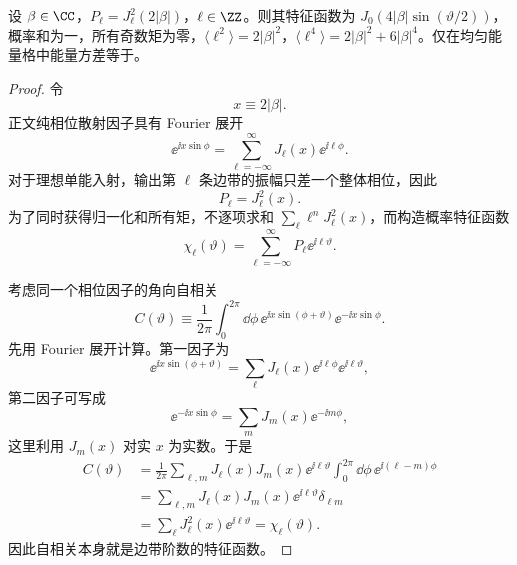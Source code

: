 \begin{lemma}
设 $\beta\in\CC$，$P_\ell=J_\ell^2(2|\beta|)$，$\ell\in\ZZ$。则其特征函数为 $J_0(4|\beta|\sin(\vartheta/2))$，概率和为一，所有奇数矩为零，$\langle\ell^2\rangle=2|\beta|^2$，$\langle\ell^4\rangle=2|\beta|^2+6|\beta|^4$。仅在均匀能量格中能量方差等于。
\end{lemma}
\begin{proof}
令
\begin{equation*}
 x\equiv2|\beta|.
\end{equation*}
正文纯相位散射因子具有 Fourier 展开
\begin{equation*}
 \ee^{\ii x\sin\phi}
 =\sum_{\ell=-\infty}^{\infty}
 J_\ell(x)\ee^{\ii\ell\phi}.
\end{equation*}
对于理想单能入射，输出第 $\ell$ 条边带的振幅只差一个整体相位，因此
\begin{equation*}
 P_\ell=J_\ell^2(x).
\end{equation*}
为了同时获得归一化和所有矩，不逐项求和 $\sum_\ell \ell^nJ_\ell^2(x)$，而构造概率特征函数
\begin{equation*}
 \chi_\ell(\vartheta)
 =\sum_{\ell=-\infty}^{\infty}
 P_\ell \ee^{\ii\ell\vartheta}.
\end{equation*}

考虑同一个相位因子的角向自相关
\begin{equation*}
 C(\vartheta)
 \equiv\frac1{2\pi}
 \int_0^{2\pi}\dd\phi\,
 \ee^{\ii x\sin(\phi+\vartheta)}
 \ee^{-\ii x\sin\phi}.
\end{equation*}
先用 Fourier 展开计算。第一因子为
\begin{equation*}
 \ee^{\ii x\sin(\phi+\vartheta)}
 =\sum_{\ell}J_\ell(x)
 \ee^{\ii\ell\phi}\ee^{\ii\ell\vartheta},
\end{equation*}
第二因子可写成
\begin{equation*}
 \ee^{-\ii x\sin\phi}
 =\sum_mJ_m(x)\ee^{-\ii m\phi},
\end{equation*}
这里利用 $J_m(x)$ 对实 $x$ 为实数。于是
\begin{align*}
 C(\vartheta)
 &=\frac1{2\pi}
 \sum_{\ell,m}J_\ell(x)J_m(x)\ee^{\ii\ell\vartheta}
 \int_0^{2\pi}\dd\phi\,
 \ee^{\ii(\ell-m)\phi}\\
 &=\sum_{\ell,m}J_\ell(x)J_m(x)\ee^{\ii\ell\vartheta}
 \delta_{\ell m}\\
 &=\sum_\ell J_\ell^2(x)\ee^{\ii\ell\vartheta}
 =\chi_\ell(\vartheta).
\end{align*}
因此自相关本身就是边带阶数的特征函数。


\end{proof}
